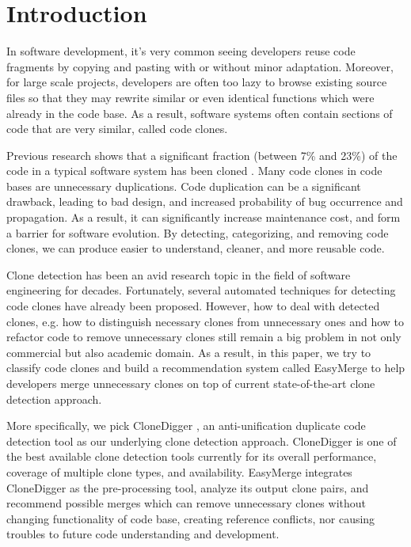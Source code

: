 \documentclass{acm_proc_article-sp}
\begin{document}
\section{Introduction}
In software development, it's very common seeing developers reuse code fragments by copying and pasting with or without minor adaptation.
Moreover, for large scale projects, developers are often too lazy to browse existing source files so that they may rewrite similar or even identical functions which
were already in the code base. As a result, software systems often contain sections of code that are very similar, called code clones.

Previous research shows that a significant fraction (between 7\% and 23\%) of the code in a typical software system has been cloned \cite{baker} \cite{roy1}. Many code clones
in code bases are unnecessary duplications. 
Code duplication can be a significant drawback, leading to bad design, and increased probability of bug occurrence and propagation. As a result, it can significantly
increase maintenance cost, and form a barrier for software evolution. By detecting, categorizing,
and removing code clones, we can produce easier to understand, cleaner, and more reusable code.

Clone detection has been an avid research topic in the field of software engineering for decades. Fortunately, several automated techniques for detecting code clones
have already been proposed. However, how to deal with detected clones, e.g. how to distinguish necessary clones from unnecessary ones and how to refactor code to remove
unnecessary clones still remain a big problem in not only commercial but also academic domain. As a result, in this paper, we try to classify code clones and build
a recommendation system called EasyMerge to help developers merge unnecessary clones on top of current state-of-the-art clone detection approach.

More specifically, we pick CloneDigger \cite{bulychev}, an anti-unification duplicate code detection tool as our underlying clone detection approach. CloneDigger is one of the best available 
clone detection tools currently for its overall performance, coverage of multiple clone types, and availability. 
EasyMerge integrates CloneDigger as the pre-processing tool, analyze its output clone pairs, and recommend possible merges which can remove unnecessary clones without changing functionality of code base, creating reference conflicts, nor causing troubles to future code understanding and development.
\end{document}
